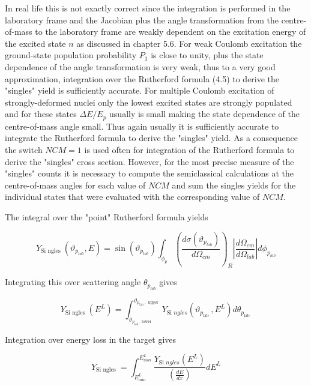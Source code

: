 \documentclass[10pt]{article}
\begin{document}
In real life this is not exactly correct since the integration is performed in the laboratory frame and the Jacobian plus the angle transformation from the centre-of-mass to the laboratory frame are weakly dependent on the excitation energy of the excited state $n$ as discussed in chapter 5.6. For weak Coulomb excitation the ground-state population probability $P_{1}$ is close to unity, plus the state dependence of the angle transformation is very weak, thus to a very good approximation, integration over the Rutherford formula (4.5) to derive the "singles" yield is sufficiently accurate. For multiple Coulomb excitation of strongly-deformed nuclei only the lowest excited states are strongly populated and for these states $\Delta E / E_{p}$ usually is small making the state dependence of the centre-of-mass angle small. Thus again usually it is sufficiently accurate to integrate the Rutherford formula to derive the "singles" yield. As a consequence the switch $N C M=1$ is used often for integration of the Rutherford formula to derive the "singles" cross section. However, for the most precise measure of the "singles" counts it is necessary to compute the semiclassical calculations at the centre-of-mass angles for each value of $N C M$ and sum the singles yields for the individual states that were evaluated with the corresponding value of $N C M$.

The integral over the "point" Rutherford formula yields


\begin{equation*}
Y_{\text {Si ngles }}\left(\vartheta_{p_{l a b}}, E\right)=\sin \left(\vartheta_{p_{l a b}}\right) \int_{\phi_{p}}\left(\frac{d \sigma\left(\vartheta_{p_{l a b}}\right)}{d \Omega_{c m}}\right)_{R}\left|\frac{d \Omega_{c m}}{d \Omega_{l a b}}\right| d \phi_{p_{l a b}} \tag{6.71}
\end{equation*}


Integrating this over scattering angle $\theta_{p_{l a b}}$ gives


\begin{equation*}
Y_{\text {Si ngles }}\left(E^{L}\right)=\int_{\vartheta_{p_{l a b}, \text { lower }}}^{\vartheta_{p_{\text {lab }}, \text { upper }}} Y_{\text {Si } n g l e s}\left(\vartheta_{p_{\text {lab }}}, E^{L}\right) d \theta_{p_{\text {lab }}} \tag{6.72}
\end{equation*}


Integration over energy loss in the target gives


\begin{equation*}
Y_{\text {Si ngles }}=\int_{E_{\min }^{L}}^{E_{\max }^{L}} \frac{Y_{\text {Si } n g l e s}\left(E^{L}\right)}{\left(\frac{d E}{d x}\right)} d E^{L} \tag{6.73}
\end{equation*}
\end{document}
